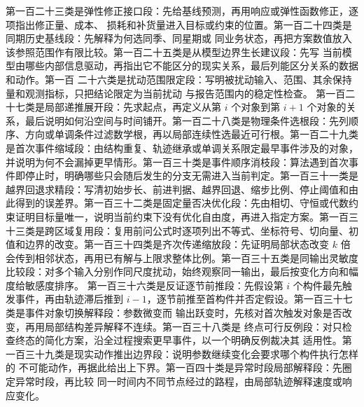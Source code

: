 第一百二十三类是弹性修正接口段：先给基线预测，再用响应或弹性函数修正，逐项指出修正量、成本、
损耗和补货量进入目标或约束的位置。第一百二十四类是同期历史基线段：先解释为何选同季、同星期或
同业务状态，再把方案数值放入该参照范围作有限比较。第一百二十五类是从模型边界生长建议段：先写
当前模型由哪些内部信息驱动，再指出它不能区分的现实关系，最后列能区分关系的数据和动作。第一百
二十六类是扰动范围限定段：写明被扰动输入、范围、其余保持量和观测指标，只把结论限定为当前扰动
与报告范围内的稳定性检查。
第一百二十七类是局部递推展开段：先求起点，再定义从第 $i$ 个对象到第 $i+1$ 个对象的关系，最后说明如何沿空间与时间铺开。第一百二十八类是物理条件选根段：先列顺序、方向或单调条件过滤数学根，再以局部连续性选最近可行根。第一百二十九类是首次事件缩域段：由结构重复、轨迹继承或单调关系限定最早事件涉及的对象，并说明为何不会漏掉更早情形。第一百三十类是事件顺序消枝段：算法遇到首次事件即停止时，明确哪些只会随后发生的分支无需进入当前判定。第一百三十一类是越界回退求精段：写清初始步长、前进判据、越界回退、缩步比例、停止阈值和由此得到的误差界。第一百三十二类是固定量否决优化段：先由相切、守恒或代数约束证明目标量唯一，说明当前约束下没有优化自由度，再进入指定方案。第一百三十三类是跨区域复用段：复用前问公式时逐项列出不等式、坐标符号、切向量、初值和边界的改变。第一百三十四类是齐次传递缩放段：先证明局部状态改变 $k$ 倍会传到相邻状态，再用已有解与上限求整体比例。第一百三十五类是同输出灵敏度比较段：对多个输入分别作同尺度扰动，始终观察同一输出，最后按变化方向和幅度给敏感度排序。
第一百三十六类是反证逐节前推段：先假设第 $i$ 个构件最先触发事件，再由轨迹滞后推到
$i-1$，逐节前推至首构件并否定假设。第一百三十七类是事件对象切换解释段：参数微变而
输出跃变时，先核对首次触发对象是否改变，再用局部结构差异解释不连续。第一百三十八类是
终点可行反例段：对只检查终态的简化方案，沿全过程搜索更早事件，以一个明确反例裁决其
适用性。第一百三十九类是现实动作推出边界段：说明参数继续变化会要求哪个构件执行怎样的
不可能动作，再据此给出上下界。第一百四十类是异常时段局部解释段：先圈定异常时段，再比较
同一时间内不同节点经过的路程，由局部轨迹解释速度或响应变化。

